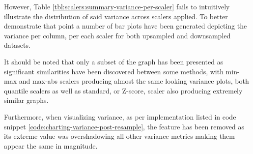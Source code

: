 However, Table \ref{tbl:scalers:summary-variance-per-scaler} fails to intuitively illustrate the distribution of said variance across scalers applied. To better demonstrate that point a number of bar plots have been generated depicting the variance per column, per each scaler for both upsampled and downsampled datasets. 

It should be noted that only a subset of the graph has been presented as significant similarities have been discovered between some methods, with min-max and max-abs scalers producing almost the same looking variance plots, both quantile scalers as well as standard, or Z-score, scaler also producing extremely similar graphs.

Furthermore, when visualizing variance, as per implementation listed in code snippet \ref{code:charting-variance-post-resample}, the \fileAgeInSec{} feature has been removed as its extreme value was overshadowing all other variance metrics making them appear the same in magnitude. 

